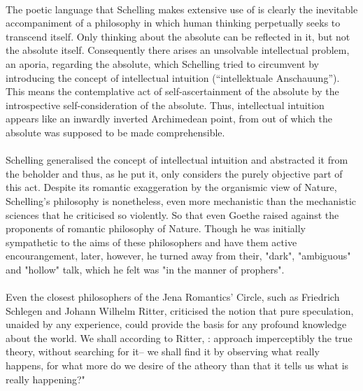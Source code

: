 \documentclass[10pt]{article}
\newcounter{theo}
\begin{document}
            \\
            The poetic language that Schelling makes extensive use of is clearly the inevitable accompaniment of a philosophy in which human thinking perpetually seeks to transcend itself. Only thinking about the absolute can be reflected in it, but not the absolute itself. Consequently there arises an unsolvable intellectual problem, an aporia, regarding the absolute, which Schelling tried to circumvent by introducing the concept of intellectual intuition (“intellektuale Anschauung”). This means the contemplative act of self-ascertainment of the absolute by the introspective self-consideration of the absolute. Thus, intellectual intuition appears like an inwardly inverted Archimedean point, from out of which the absolute was supposed to be made comprehensible.
            \\
            \\
            Schelling generalised the concept of intellectual intuition and abstracted it from the beholder and thus, as he put it, only considers the purely objective part of this act. Despite its romantic exaggeration by the organismic view of Nature, Schelling's philosophy is nonetheless, even more mechanistic than the mechanistic sciences that he criticised so violently. So that even Goethe raised against the proponents of romantic philosophy of Nature. Though he was initially sympathetic to the aims of these philosophers and have them active encourangement, later, however, he turned away from their, "dark", "ambiguous" and "hollow" talk, which he felt was "in the manner of prophers".
            \\
            \\
            Even the closest philosophers of the Jena Romantics' Circle, such as Friedrich Schlegen and Johann Wilhelm Ritter, criticised the notion that pure speculation, unaided by any experience, could provide the basis for any profound knowledge about the world. We shall according to Ritter, : approach imperceptibly the true theory, without searching for it-- we shall find it by observing what really happens, for what more do we desire of the atheory than that it tells us what is really happening?"
\end{document}
